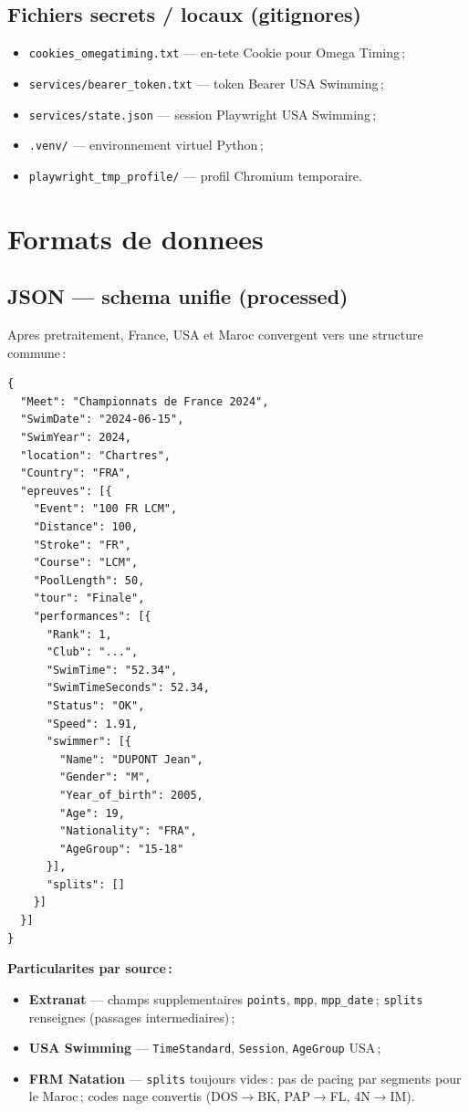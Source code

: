 \documentclass[11pt,a4paper]{article}
\begin{document}
\subsection{Fichiers secrets / locaux (gitignores)}

\begin{itemize}
  \item \texttt{cookies\_omegatiming.txt} --- en-tete Cookie pour Omega Timing\,;
  \item \texttt{services/bearer\_token.txt} --- token Bearer USA Swimming\,;
  \item \texttt{services/state.json} --- session Playwright USA Swimming\,;
  \item \texttt{.venv/} --- environnement virtuel Python\,;
  \item \texttt{playwright\_tmp\_profile/} --- profil Chromium temporaire.
\end{itemize}

\section{Formats de donnees}

\subsection{JSON --- schema unifie (processed)}
\label{sec:schema-unifie}

Apres pretraitement, France, USA et Maroc convergent vers une structure commune\,:

\begin{lstlisting}
{
  "Meet": "Championnats de France 2024",
  "SwimDate": "2024-06-15",
  "SwimYear": 2024,
  "location": "Chartres",
  "Country": "FRA",
  "epreuves": [{
    "Event": "100 FR LCM",
    "Distance": 100,
    "Stroke": "FR",
    "Course": "LCM",
    "PoolLength": 50,
    "tour": "Finale",
    "performances": [{
      "Rank": 1,
      "Club": "...",
      "SwimTime": "52.34",
      "SwimTimeSeconds": 52.34,
      "Status": "OK",
      "Speed": 1.91,
      "swimmer": [{
        "Name": "DUPONT Jean",
        "Gender": "M",
        "Year_of_birth": 2005,
        "Age": 19,
        "Nationality": "FRA",
        "AgeGroup": "15-18"
      }],
      "splits": []
    }]
  }]
}
\end{lstlisting}

\textbf{Particularites par source\,:}
\begin{itemize}
  \item \textbf{Extranat} --- champs supplementaires \texttt{points}, \texttt{mpp}, \texttt{mpp\_date}\,; \texttt{splits} renseignes (passages intermediaires)\,;
  \item \textbf{USA Swimming} --- \texttt{TimeStandard}, \texttt{Session}, \texttt{AgeGroup} USA\,;
  \item \textbf{FRM Natation} --- \texttt{splits} toujours vides\,: pas de pacing par segments pour le Maroc\,; codes nage convertis (DOS$\rightarrow$BK, PAP$\rightarrow$FL, 4N$\rightarrow$IM).
\end{itemize}
\end{document}

